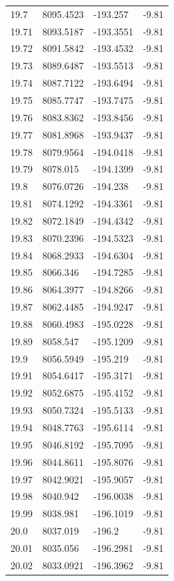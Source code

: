 \begin{table}[H]
\begin{tabular}{llll}
19.7 & 8095.4523 & -193.257 & -9.81 \\
19.71 & 8093.5187 & -193.3551 & -9.81 \\
19.72 & 8091.5842 & -193.4532 & -9.81 \\
19.73 & 8089.6487 & -193.5513 & -9.81 \\
19.74 & 8087.7122 & -193.6494 & -9.81 \\
19.75 & 8085.7747 & -193.7475 & -9.81 \\
19.76 & 8083.8362 & -193.8456 & -9.81 \\
19.77 & 8081.8968 & -193.9437 & -9.81 \\
19.78 & 8079.9564 & -194.0418 & -9.81 \\
19.79 & 8078.015 & -194.1399 & -9.81 \\
19.8 & 8076.0726 & -194.238 & -9.81 \\
19.81 & 8074.1292 & -194.3361 & -9.81 \\
19.82 & 8072.1849 & -194.4342 & -9.81 \\
19.83 & 8070.2396 & -194.5323 & -9.81 \\
19.84 & 8068.2933 & -194.6304 & -9.81 \\
19.85 & 8066.346 & -194.7285 & -9.81 \\
19.86 & 8064.3977 & -194.8266 & -9.81 \\
19.87 & 8062.4485 & -194.9247 & -9.81 \\
19.88 & 8060.4983 & -195.0228 & -9.81 \\
19.89 & 8058.547 & -195.1209 & -9.81 \\
19.9 & 8056.5949 & -195.219 & -9.81 \\
19.91 & 8054.6417 & -195.3171 & -9.81 \\
19.92 & 8052.6875 & -195.4152 & -9.81 \\
19.93 & 8050.7324 & -195.5133 & -9.81 \\
19.94 & 8048.7763 & -195.6114 & -9.81 \\
19.95 & 8046.8192 & -195.7095 & -9.81 \\
19.96 & 8044.8611 & -195.8076 & -9.81 \\
19.97 & 8042.9021 & -195.9057 & -9.81 \\
19.98 & 8040.942 & -196.0038 & -9.81 \\
19.99 & 8038.981 & -196.1019 & -9.81 \\
20.0 & 8037.019 & -196.2 & -9.81 \\
20.01 & 8035.056 & -196.2981 & -9.81 \\
20.02 & 8033.0921 & -196.3962 & -9.81 \\

\end{tabular}
\end{table}
